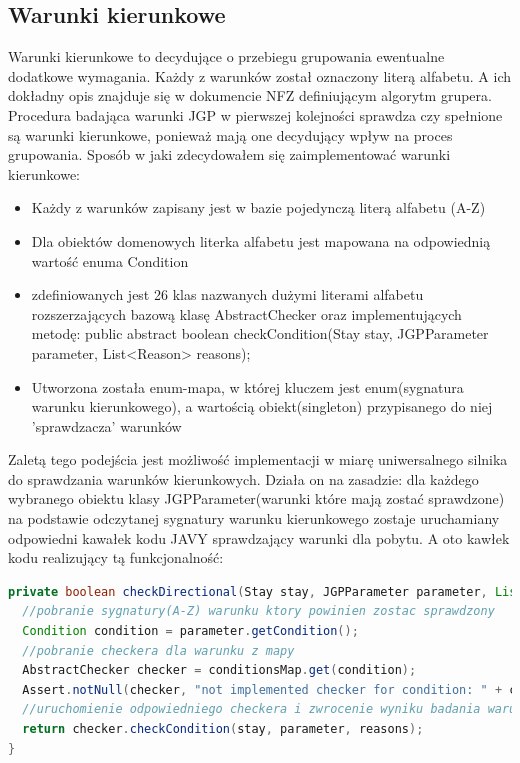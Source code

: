 \subsection{Warunki kierunkowe}
\label{sec:warunkiKierunkowe}
Warunki kierunkowe to decydujące o przebiegu grupowania ewentualne dodatkowe wymagania. Każdy z warunków został oznaczony literą alfabetu. A ich  dokładny opis znajduje się w dokumencie NFZ definiującym algorytm grupera. Procedura badająca warunki JGP w pierwszej kolejności sprawdza czy spełnione są warunki kierunkowe, ponieważ mają one decydujący wpływ na proces grupowania.
Sposób w jaki zdecydowałem się zaimplementować warunki kierunkowe:
\begin{itemize}
\item Każdy z warunków zapisany jest w bazie pojedynczą literą alfabetu (A-Z)
\item Dla obiektów domenowych literka alfabetu jest mapowana na odpowiednią wartość enuma Condition
\item zdefiniowanych jest 26 klas nazwanych dużymi literami alfabetu rozszerzających bazową klasę AbstractChecker oraz implementujących metodę:
  public abstract boolean checkCondition(Stay stay, JGPParameter parameter, List<Reason> reasons);
\item Utworzona została enum-mapa, w której kluczem jest enum(sygnatura warunku kierunkowego), a wartością obiekt(singleton) przypisanego do niej 'sprawdzacza' warunków
\end{itemize}
Zaletą tego podejścia jest możliwość implementacji w miarę uniwersalnego silnika do sprawdzania warunków kierunkowych. Działa on na zasadzie: dla każdego wybranego obiektu klasy JGPParameter(warunki które mają zostać sprawdzone) na podstawie odczytanej sygnatury warunku kierunkowego zostaje uruchamiany odpowiedni kawałek kodu JAVY sprawdzający warunki dla pobytu. A oto kawłek kodu realizujący tą funkcjonalność:

\begin{lstlisting}[language=Java]
private boolean checkDirectional(Stay stay, JGPParameter parameter, List<Reason> reasons) {
  //pobranie sygnatury(A-Z) warunku ktory powinien zostac sprawdzony
  Condition condition = parameter.getCondition();
  //pobranie checkera dla warunku z mapy
  AbstractChecker checker = conditionsMap.get(condition);
  Assert.notNull(checker, "not implemented checker for condition: " + condition);
  //uruchomienie odpowiedniego checkera i zwrocenie wyniku badania warunku
  return checker.checkCondition(stay, parameter, reasons);
}
\end{lstlisting}

